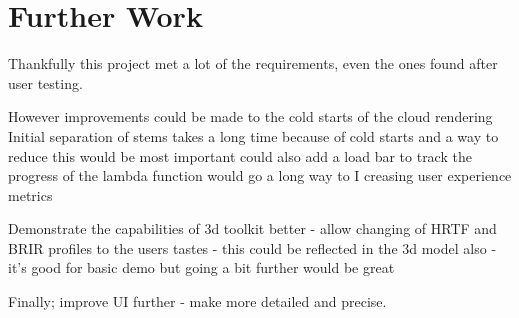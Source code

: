 \thispagestyle{plain}
\newpage
\section{Further Work}\label{sec:further-work}

\normalsize

Thankfully this project met a lot of the requirements, even the ones found after user testing.

However improvements could be made to the cold starts of the cloud rendering
Initial separation of stems takes a long time because of cold starts and a way to reduce this would be most important could also add a load bar to track the progress of the lambda function would go a long way to I creasing user experience metrics

Demonstrate the capabilities of 3d toolkit better - allow changing of HRTF and BRIR profiles to the users tastes - this could be reflected in the 3d model also - it's good for basic demo but going a bit further would be great

Finally; improve UI further - make more detailed and precise.